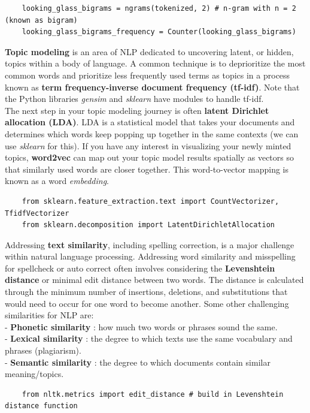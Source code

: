\documentclass[11pt, a4paper]{article}
\begin{document}
\begin{spacing}{1.1}
\begin{lstlisting}
	looking_glass_bigrams = ngrams(tokenized, 2) # n-gram with n = 2 (known as bigram)
	looking_glass_bigrams_frequency = Counter(looking_glass_bigrams)  \end{lstlisting} \vspace*{1mm}
	\textbf{Topic modeling} is an area of NLP dedicated to uncovering latent, or hidden, topics within a body of language. A common technique is to deprioritize the most common words and prioritize less frequently used terms as topics in a process known as \textbf{term frequency-inverse document frequency (tf-idf)}. Note that the Python libraries \textit{gensim} and \textit{sklearn} have modules to handle tf-idf. \vspace*{1mm} \\
	The next step in your topic modeling journey is often \textbf{latent Dirichlet allocation (LDA)}. LDA is a statistical model that takes your documents and determines which words keep popping up together in the same contexts (we can use \textit{sklearn} for this). If you have any interest in visualizing your newly minted topics, \textbf{word2vec} can map out your topic model results spatially as vectors so that similarly used words are closer together. This word-to-vector mapping is known as a word \textit{embedding}.
	\begin{lstlisting}
	from sklearn.feature_extraction.text import CountVectorizer, TfidfVectorizer
	from sklearn.decomposition import LatentDirichletAllocation	\end{lstlisting} \vspace*{1mm}
	Addressing \textbf{text similarity}, including spelling correction, is a major challenge within natural language processing. Addressing word similarity and misspelling for spellcheck or auto correct often involves considering the \textbf{Levenshtein distance} or minimal edit distance between two words. The distance is calculated through the minimum number of insertions, deletions, and substitutions that would need to occur for one word to become another. Some other challenging similarities for NLP are: \\
	\hspace*{2mm} - \textbf{Phonetic similarity} : how much two words or phrases sound the same. \\
	\hspace*{2mm} - \textbf{Lexical similarity} : the degree to which texts use the same vocabulary and phrases (plagiarism). \\
	\hspace*{2mm} - \textbf{Semantic similarity} : the degree to which documents contain similar meaning/topics.
	\begin{lstlisting}
	from nltk.metrics import edit_distance # build in Levenshtein distance function	
	

\end{lstlisting}
\end{spacing}
\end{document}
